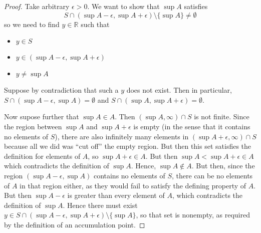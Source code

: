 \documentclass[letterpaper,11pt]{article}
\newcommand{\R}{\mathbb{R}}
\begin{document}
\begin{proof}
    Take arbitrary $\epsilon > 0$. We want to show that $\sup{A}$ satisfies
    \begin{equation*}
        S \cap (\sup{A} - \epsilon, \sup{A} + \epsilon) \setminus \{\sup{A}\}
        \neq \emptyset
    \end{equation*}
    so we need to find $y \in \R$ such that
    \begin{itemize}
        \item $y \in S$
        \item $y \in (\sup{A} - \epsilon, \sup{A} + \epsilon)$
        \item $y \neq \sup{A}$
    \end{itemize}

    Suppose by contradiction that such a $y$ does not exist. Then in
    particular, $S \cap (\sup{A} - \epsilon, \sup{A}) = \emptyset$ and
    $S \cap (\sup{A}, \sup{A} + \epsilon) = \emptyset$.

    Now supose further that $\sup{A} \in A$.
    Then $(\sup{A}, \infty) \cap S$ is not finite.
    Since the region between $\sup{A}$ and $\sup{A} + \epsilon$ is empty (in
    the sense that it contains no elements of $S$), there are also infinitely
    many elements in $(\sup{A} + \epsilon, \infty) \cap S$ because all we did
    was ``cut off'' the empty region. But then this set satisfies the
    definition for elements of $A$, so $\sup{A} + \epsilon \in A$.
    But then
    $\sup{A} < \sup{A} + \epsilon \in A$ which
    contradicts the definition of $\sup{A}$. Hence, $\sup{A} \notin A$.
    But then, since the region $(\sup{A} - \epsilon, \sup{A})$ contains no
    elements of $S$, there can be no elements of $A$ in that region either, as
    they would fail to satisfy the defining property of $A$.
    But then
    $\sup{A} - \epsilon$ is greater than every element of $A$, which
    contradicts the definition of $\sup{A}$. Hence there must exist
    $y \in S
    \cap (\sup{A} - \epsilon, \sup{A} + \epsilon) \setminus \{\sup{A}\}$,
    so that set is nonempty, as required by the definition of an accumulation
    point.
\end{proof}
\end{document}
